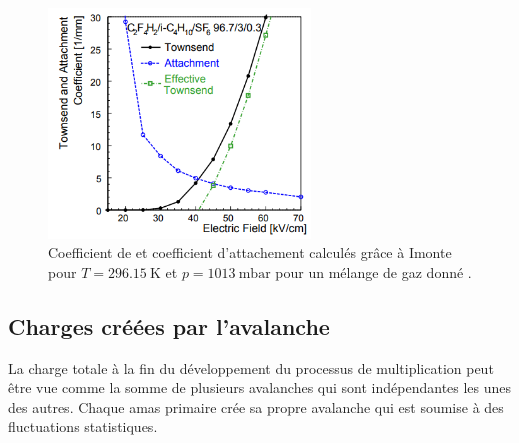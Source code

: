 \begin{figure}[ht!]
	\centering
	\includegraphics[width=0.62\textwidth]{RPC/tow.png}
	\captionsetup{type=figure}\caption{Coefficient de  et coefficient d'attachement calculés grâce à Imonte \cite{imonte} pour $T=\SI{296.15}{\kelvin}$ et $p=\SI{1013}{\milli\bar}$ pour un mélange de gaz donné \cite{Riegler:570462}.}
	\label{tow}
\end{figure}

\subsection{Charges créées par l'avalanche}
La charge totale à la fin du développement du processus de multiplication peut être vue comme la somme de plusieurs avalanches qui sont indépendantes les unes des autres. Chaque amas primaire crée sa propre avalanche qui est soumise à des fluctuations statistiques.

